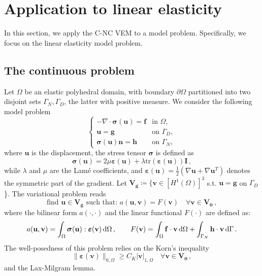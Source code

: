 \documentclass[a4paper,11pt]{article}
\theoremstyle{remark}
\theoremstyle{definition}
\begin{document}
\section{Application to linear elasticity}\label{sec:2}

In this section, we apply the C-NC VEM to a model problem. Specifically, we focus on the linear elasticity model problem.

\subsection{The continuous problem}

Let $\Omega$ be an elastic polyhedral domain, with boundary $\partial \Omega$ partitioned into two disjoint sets $\Gamma_N, \Gamma_D$, the latter with positive measure.
We consider the following model problem
\begin{equation}\label{eq:problemacontinuo}
\begin{cases}
-\nabla \cdot \boldsymbol{\sigma}(\mathbf{u}) = \mathbf{f} & \text{in } \Omega, \\
\mathbf{u} = \mathbf{g} & \text{on } \Gamma_D, \\
\boldsymbol{\sigma}(\mathbf{u}) \mathbf{n} = \mathbf{h} & \text{on } \Gamma_N,
\end{cases}
\end{equation}
where $\mathbf{u}$ is the displacement, the stress tensor $\boldsymbol{\sigma}$ is defined as
\[
\boldsymbol{\sigma}(\mathbf{u}) = 2\mu \boldsymbol{\varepsilon}(\mathbf{u}) + \lambda \text{tr}(\boldsymbol{\varepsilon}(\mathbf{u})) \mathbf{I} \, ,
\]
while $\lambda $ and $\mu$ are the Lam\'e coefficients, and  $\boldsymbol{\varepsilon}(\mathbf{u}) = \frac{1}{2} \left( \nabla \mathbf{u} + \nabla \mathbf{u}^T \right)$ denotes the symmetric part of the gradient. 
%
Let $\mathbf{V}_\mathbf{g} \coloneqq \{\mathbf{v}\in [H^1(\Omega)]^3$ s.t. $\mathbf{u} = \mathbf g$ on $\Gamma_D$\}.
%
The variational problem reads
\begin{equation}
\text{find } \mathbf{u} \in \mathbf{V}_\mathbf{g} \text{ such that: }
a(\mathbf{u}, \mathbf{v}) = F(\mathbf{v}) \quad \forall \mathbf{v} \in \mathbf{V}_\mathbf{0} \, ,
\end{equation}
where the bilinear form $a(\cdot, \cdot)$ and the linear functional $F(\cdot)$ are defined as:
$$
a(\mathbf{u}, \mathbf{v}) = \int_{\Omega} \boldsymbol{\sigma}(\mathbf{u}) : \boldsymbol{\varepsilon}(\mathbf{v}) \, {\rm d} \Omega \, , \qquad
F(\mathbf{v}) = \int_{\Omega} \mathbf{f} \cdot \mathbf{v} \, {\rm d} \Omega + \int_{\Gamma_N} \mathbf{h} \cdot \mathbf{v} \, {\rm d} \Gamma \, .
$$
The well-posedness of this problem relies on the Korn's inequality
\begin{equation}
\|\boldsymbol{\varepsilon}(\mathbf{v})\|_{0,\Omega} \geq C_K |\mathbf{v}|_{1,\Omega} \quad \forall \mathbf{v} \in \mathbf{V}_\mathbf{0} \, ,
\end{equation}
and the Lax-Milgram lemma.
\end{document}
